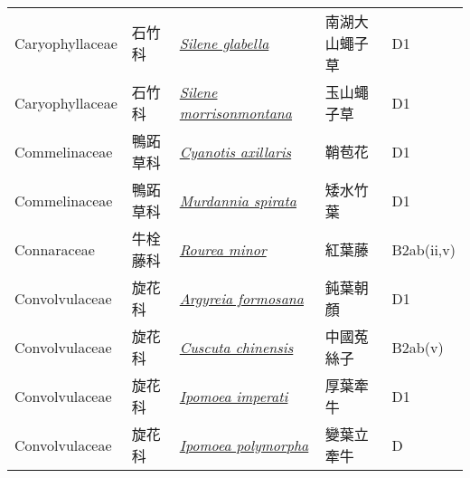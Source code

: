 {\begin{longtable}{L{2.5cm}L{2cm}L{5cm}L{2.5cm}L{3cm}}
    Caryophyllaceae & 石竹科 & \href{http://www.theplantlist.org/tpl1.1/search?q=Silene+glabella}{\textit{Silene glabella} } & 南湖大山蠅子草 & D1    \\
    Caryophyllaceae & 石竹科 & \href{http://www.theplantlist.org/tpl1.1/search?q=Silene+morrisonmontana}{\textit{Silene morrisonmontana} } & 玉山蠅子草 & D1    \\
    Commelinaceae & 鴨跖草科 & \href{http://www.theplantlist.org/tpl1.1/search?q=Cyanotis+axillaris}{\textit{Cyanotis axillaris} } & 鞘苞花 & D1    \\
    Commelinaceae & 鴨跖草科 & \href{http://www.theplantlist.org/tpl1.1/search?q=Murdannia+spirata}{\textit{Murdannia spirata} } & 矮水竹葉 & D1    \\
    Connaraceae & 牛栓藤科 & \href{http://www.theplantlist.org/tpl1.1/search?q=Rourea+minor}{\textit{Rourea minor} } & 紅葉藤 & B2ab(ii,v)    \\
    Convolvulaceae & 旋花科 & \href{http://www.theplantlist.org/tpl1.1/search?q=Argyreia+formosana}{\textit{Argyreia formosana} } & 鈍葉朝顏 & D1    \\
    Convolvulaceae & 旋花科 & \href{http://www.theplantlist.org/tpl1.1/search?q=Cuscuta+chinensis}{\textit{Cuscuta chinensis} } & 中國菟絲子 & B2ab(v)    \\
    Convolvulaceae & 旋花科 & \href{http://www.theplantlist.org/tpl1.1/search?q=Ipomoea+imperati}{\textit{Ipomoea imperati} } & 厚葉牽牛 & D1    \\
    Convolvulaceae & 旋花科 & \href{http://www.theplantlist.org/tpl1.1/search?q=Ipomoea+polymorpha}{\textit{Ipomoea polymorpha} } & 變葉立牽牛 & D    \\

\end{longtable}}
